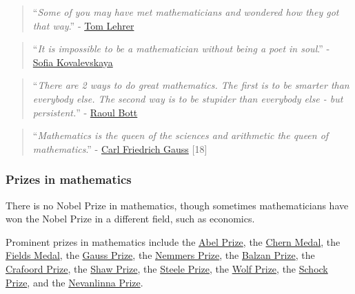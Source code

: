 \documentclass{article}
\begin{document}
\begin{quotation}
	``\textit{Some of you may have met mathematicians and wondered how they got that way}.'' - \href{https://en.wikipedia.org/wiki/Tom_Lehrer}{Tom Lehrer}
\end{quotation}

\begin{quotation}
	``\textit{It is impossible to be a mathematician without being a poet in soul}.'' - \href{https://en.wikipedia.org/wiki/Sofia_Kovalevskaya}{Sofia Kovalevskaya}
\end{quotation}

\begin{quotation}
	``\textit{There are 2 ways to do great mathematics. The first is to be smarter than everybody else. The second way is to be stupider than everybody else - but persistent.}'' - \href{https://en.wikipedia.org/wiki/Raoul_Bott}{Raoul Bott}
\end{quotation}

\begin{quotation}
	``\textit{Mathematics is the queen of the sciences and arithmetic the queen of mathematics}.'' - \href{https://en.wikipedia.org/wiki/Carl_Friedrich_Gauss}{Carl Friedrich Gauss} [18]
\end{quotation}

\subsubsection{Prizes in mathematics}
There is no Nobel Prize in mathematics, though sometimes mathematicians have won the Nobel Prize in a different field, such as economics.

Prominent prizes in mathematics include the \href{https://en.wikipedia.org/wiki/Abel_Prize}{Abel Prize}, the \href{https://en.wikipedia.org/wiki/Chern_Medal}{Chern Medal}, the \href{https://en.wikipedia.org/wiki/Fields_Medal}{Fields Medal}, the \href{https://en.wikipedia.org/wiki/Gauss_Prize}{Gauss Prize}, the \href{https://en.wikipedia.org/wiki/Frederic_Esser_Nemmers_Prize}{Nemmers Prize}, the \href{https://en.wikipedia.org/wiki/Balzan_Prize}{Balzan Prize}, the \href{https://en.wikipedia.org/wiki/Crafoord_Prize}{Crafoord Prize}, the \href{https://en.wikipedia.org/wiki/Shaw_Prize}{Shaw Prize}, the \href{https://en.wikipedia.org/wiki/Steele_Prize}{Steele Prize}, the \href{https://en.wikipedia.org/wiki/Wolf_Prize}{Wolf Prize}, the \href{https://en.wikipedia.org/wiki/Schock_Prize}{Schock Prize}, and the \href{https://en.wikipedia.org/wiki/Nevanlinna_Prize}{Nevanlinna Prize}.
\end{document}
